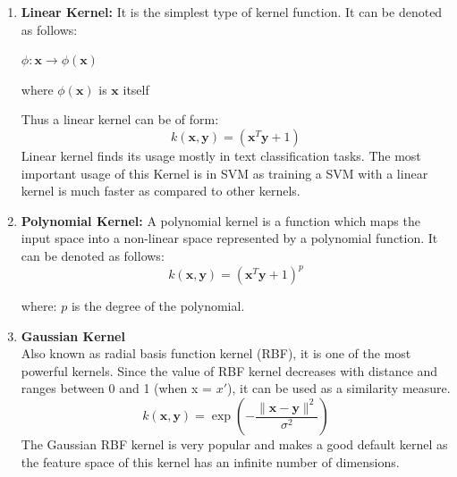 \begin{enumerate}
	\item \textbf{Linear Kernel:}
	It is the simplest type of kernel function. It can be denoted as follows:
	\begin{center}
		$\phi : \mathbf{x} \rightarrow \phi(\mathbf{x})$
	\end{center}
	\begin{center}
		where $\phi(\mathbf{x})$ is $\mathbf{x}$ itself
	\end{center}
	Thus a linear kernel can be of form:
	\begin{equation}
	k(\mathbf{x},\mathbf{y}) = (\mathbf{x}^T \mathbf{y} +1)
	\end{equation}
	Linear kernel finds its usage mostly in text classification tasks. The most important usage of this Kernel is in SVM as training a SVM with a linear kernel is much faster as compared to other kernels.
	\item \textbf{Polynomial Kernel:} 
	A polynomial kernel is a function which maps the input space into a non-linear space represented by a polynomial function. It can be denoted as follows:
	\begin{equation}
	k(\mathbf{x},\mathbf{y}) = (\mathbf{x}^T \mathbf{y} +1)^p
	\end{equation}
	\begin{center}
		where: $p$ is the degree of the polynomial.
	\end{center}
	\item \textbf{Gaussian Kernel}\\
	Also known as radial basis function kernel (RBF), it is one of the most powerful kernels. 
	Since the value of RBF kernel decreases with distance and ranges between 0 and 1 (when x = $x'$), it can be used as a similarity measure.
	\begin{equation}
	k(\mathbf{x},\mathbf{y})=\exp\left(-\frac{\|\mathbf{x}-\mathbf{y}\|^{2}}{\sigma^{2}}\right) 
	\end{equation}
	The Gaussian RBF kernel is very popular and makes a good default kernel as the feature space of this kernel has an infinite number of dimensions.
\end{enumerate}
